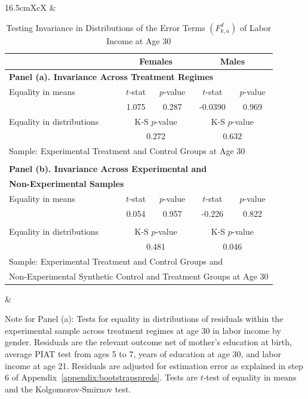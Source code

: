 \begin{table}[!htpb]
\begin{threeparttable}
\caption{Testing Invariance in Distributions of the  Error Terms $\left( F_{k,a}^d \right)$ of Labor Income at Age 30} \label{table:invarianceerrors}
\centering
\footnotesize
\begin{tabularx}{16.5cm}{XcX}
& \begin{tabular}{lcccc} \toprule
& \multicolumn{2}{c}{Females} &   \multicolumn{2}{c}{Males} \\ \midrule
\multicolumn{5}{l}{\textbf{Panel (a). Invariance Across Treatment Regimes}} \\
 Equality in means & $t$-stat & $p$-value & $t$-stat & $p$-value \\
 & 1.075 & 0.287 & -0.0390 &  0.969  \\
Equality in distributions & \multicolumn{2}{c}{K-S $p$-value} &  \multicolumn{2}{c}{K-S $p$-value}  \\
                                      & \multicolumn{2}{c}{0.272} &  \multicolumn{2}{c}{0.632}  \\
\multicolumn{5}{l}{Sample: Experimental Treatment and Control Groups at Age 30} \\ \\
\multicolumn{5}{l}{\textbf{Panel (b). Invariance Across Experimental and }} \\
\multicolumn{5}{l}{\textbf{Non-Experimental Samples}} \\
Equality in means & $t$-stat & $p$-value & $t$-stat & $p$-value \\
 & 0.054  & 0.957 & -0.226 & 0.822   \\ \\
Equality in distributions & \multicolumn{2}{c}{K-S $p$-value} &  \multicolumn{2}{c}{K-S $p$-value}  \\
                                      & \multicolumn{2}{c}{0.481} &  \multicolumn{2}{c}{0.046}  \\
\multicolumn{5}{l}{Sample: Experimental Treatment and Control Groups and} \\
\multicolumn{5}{l}{Non-Experimental Synthetic Control and Treatment Groups at Age 30 } \\ \bottomrule
\end{tabular} &
\end{tabularx}
\begin{tablenotes}
\footnotesize
\item Note for Panel (a): Tests for equality in distributions of residuals within the experimental sample across treatment regimes at age 30 in labor income by gender. Residuals are the relevant outcome net of mother's education at birth, average PIAT test from ages 5 to 7, years of education at age 30, and labor income at age 21. Residuals are adjusted for estimation error as explained in step 6 of Appendix~\ref{appendix:bootstrapspreds}. Tests are $t$-test of equality in means and the Kolgomorov-Smirnov test.\\

\end{tablenotes}
\end{threeparttable}
\end{table}
